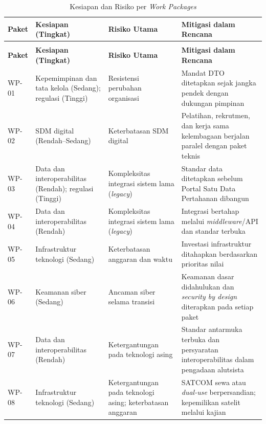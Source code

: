 {\small
\begin{longtable}{@{}>{\raggedright\arraybackslash}p{}>{\raggedright\arraybackslash}p{}>{\raggedright\arraybackslash}p{}>{\raggedright\arraybackslash}p{}@{}}
\caption{Kesiapan dan Risiko per \textit{Work Packages}}
\label{tab:d4-41}\\
\toprule
\textbf{Paket} & \textbf{Kesiapan (Tingkat)} & \textbf{Risiko Utama} & \textbf{Mitigasi dalam Rencana}\\
\midrule
\endfirsthead
\multicolumn{4}{@{}l}{\small\itshape \tablename\ \thetable{} (lanjutan)}\\
\toprule
\textbf{Paket} & \textbf{Kesiapan (Tingkat)} & \textbf{Risiko Utama} & \textbf{Mitigasi dalam Rencana}\\
\midrule
\endhead
\bottomrule
\endlastfoot
WP-01 & Kepemimpinan dan tata kelola (Sedang); regulasi (Tinggi) & Resistensi perubahan organisasi & Mandat DTO ditetapkan sejak jangka pendek dengan dukungan pimpinan\\
WP-02 & SDM digital (Rendah–Sedang) & Keterbatasan SDM digital & Pelatihan, rekrutmen, dan kerja sama kelembagaan berjalan paralel dengan paket teknis\\
WP-03 & Data dan interoperabilitas (Rendah); regulasi (Tinggi) & Kompleksitas integrasi sistem lama (\textit{legacy}) & Standar data ditetapkan sebelum Portal Satu Data Pertahanan dibangun\\
WP-04 & Data dan interoperabilitas (Rendah) & Kompleksitas integrasi sistem lama (\textit{legacy}) & Integrasi bertahap melalui \textit{middleware}/API dan standar terbuka\\
WP-05 & Infrastruktur teknologi (Sedang) & Keterbatasan anggaran dan waktu & Investasi infrastruktur ditahapkan berdasarkan prioritas nilai\\
WP-06 & Keamanan siber (Sedang) & Ancaman siber selama transisi & Keamanan dasar didahulukan dan \textit{security by design} diterapkan pada setiap paket\\
WP-07 & Data dan interoperabilitas (Rendah) & Ketergantungan pada teknologi asing & Standar antarmuka terbuka dan persyaratan interoperabilitas dalam pengadaan alutsista\\
WP-08 & Infrastruktur teknologi (Sedang) & Ketergantungan pada teknologi asing; keterbatasan anggaran & SATCOM sewa atau \textit{dual-use} berpersandian; kepemilikan satelit melalui kajian\\
\end{longtable}
}

